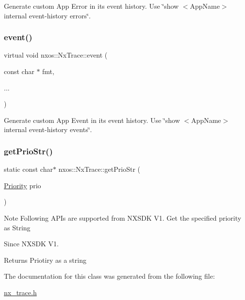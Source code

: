Generate custom App Error in its event history. Use \char`\"{}show $<$\+App\+Name$>$ internal event-\/history errors\char`\"{}. \mbox{\label{classnxos_1_1_nx_trace_a22e5e2fff39fae68fba3051dc2720621}} 
\subsubsection{\texorpdfstring{event()}{event()}}
{\footnotesize\ttfamily virtual void nxos\+::\+Nx\+Trace\+::event (\begin{DoxyParamCaption}\item[{const char $\ast$}]{fmt,  }\item[{}]{... }\end{DoxyParamCaption})\hspace{0.3cm}{\ttfamily [pure virtual]}}

Generate custom App Event in its event history. Use \char`\"{}show $<$\+App\+Name$>$ internal event-\/history events\char`\"{}. \mbox{\label{classnxos_1_1_nx_trace_a583b8a49a2111e4e4b8ef2f2eeaa4620}} 
\subsubsection{\texorpdfstring{get\+Prio\+Str()}{getPrioStr()}}
{\footnotesize\ttfamily static const char$\ast$ nxos\+::\+Nx\+Trace\+::get\+Prio\+Str (\begin{DoxyParamCaption}\item[{\mbox{\hyperlink{classnxos_1_1_nx_trace_a582f6e5a22e788c61807657f8bca088f}{Priority}}}]{prio }\end{DoxyParamCaption})\hspace{0.3cm}{\ttfamily [static]}}

\begin{DoxyNote}{Note}
Following A\+P\+Is are supported from N\+X\+S\+DK V1. Get the specified priority as String
\end{DoxyNote}
\begin{DoxySince}{Since}
N\+X\+S\+DK V1.
\end{DoxySince}
\begin{DoxyReturn}{Returns}
Priotiry as a string 
\end{DoxyReturn}


The documentation for this class was generated from the following file\+:\begin{DoxyCompactItemize}
\item 
\mbox{\hyperlink{nx__trace_8h}{nx\+\_\+trace.\+h}}\end{DoxyCompactItemize}
